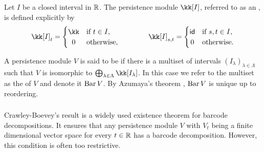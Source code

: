 \subsubsection{}
Let $I$ be a closed interval in $\mathbb{R}$.
The persistence module $\kk[I]$, referred to as an , is defined explicitly by
\[
\kk[I]_t =
\begin{cases}
	\kk & \text{if } t \in I, \\
	\hfil 0 & \text{otherwise},
\end{cases}
\qquad \qquad
\kk[I]_{s, t} =
\begin{cases}
	\id & \text{if } s, t \in I, \\
	\hfil 0 & \text{otherwise}.
\end{cases}
\]

A persistence module $V$ is said to be  if there is a multiset of intervals $(I_\lambda)_{\lambda \in \Lambda}$ such that $V$ is isomorphic to $\bigoplus_{\lambda \in \Lambda} \kk[I_\lambda]$.
In this case we refer to the multiset as the  of $V$ and denote it $\operatorname{Bar} V$.
By Azumaya’s theorem \cite{azumaya1950theorem}, $\operatorname{Bar} V$ is unique up to reordering.

\subsubsection{}
Crawley-Boevey's result \cite{Crawley-Boevey.2015} is a widely used existence theorem for barcode decompositions.
It ensures that any persistence module \(V\) with \(V_t\) being a finite dimensional vector space for every \(t \in \mathbb{R}\) has a barcode decomposition.
However, this condition is often too restrictive.

